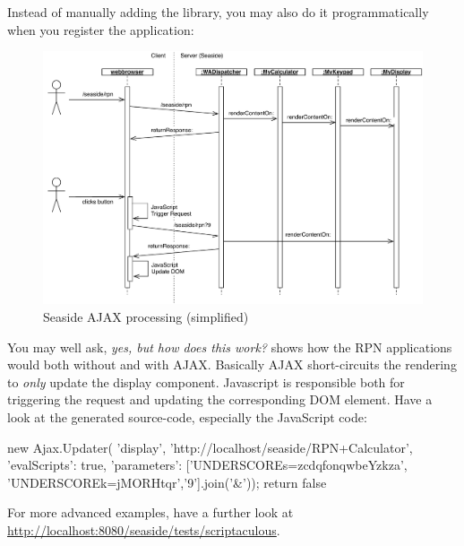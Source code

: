 \documentclass[a4paper,10pt,twoside]{book}
\begin{document}
Instead of manually adding the library, you may also do it programmatically when you register the application:
\begin{code}{}
MyCalculator class>>>initialize
	(self registerAsApplication: 'rpn')
		addLibrary: SULibrary}}
\end{code}

\begin{figure}[ht]
\begin{center}
\includegraphics[width=\textwidth]{ajax-processing}
\caption{Seaside AJAX processing (simplified)}
\label{fig:ajax-processing}
\end{center}
\end{figure}


You may well ask, \emph{yes, but how does this work?}
 shows how the RPN applications would both without and with AJAX.
Basically AJAX short-circuits the rendering to \emph{only} update the display component.
Javascript is responsible both for triggering the request and updating the corresponding DOM element.
Have a look at the generated source-code, especially the JavaScript code:

\begin{code}{}
new Ajax.Updater(
	'display',
	'http://localhost/seaside/RPN+Calculator',
	{'evalScripts': true,
	  'parameters': ['UNDERSCOREs=zcdqfonqwbeYzkza', 'UNDERSCOREk=jMORHtqr','9'].join('&')});
return false
\end{code}

For more advanced examples, have a further look at \url{http://localhost:8080/seaside/tests/scriptaculous}.
\end{document}
